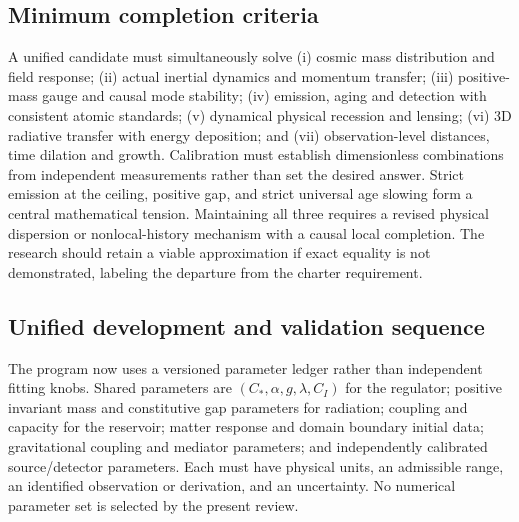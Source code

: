 \documentclass[
  11pt,
  twoside]{article}
\begin{document}
\subsection{Minimum completion
criteria}\label{minimum-completion-criteria}

A unified candidate must simultaneously solve (i) cosmic mass
distribution and field response; (ii) actual inertial dynamics and
momentum transfer; (iii) positive-mass gauge and causal mode stability;
(iv) emission, aging and detection with consistent atomic standards; (v)
dynamical physical recession and lensing; (vi) 3D radiative transfer
with energy deposition; and (vii) observation-level distances, time
dilation and growth. Calibration must establish dimensionless
combinations from independent measurements rather than set the desired
answer. Strict emission at the ceiling, positive gap, and strict
universal age slowing form a central mathematical tension. Maintaining
all three requires a revised physical dispersion or nonlocal-history
mechanism with a causal local completion. The research should retain a
viable approximation if exact equality is not demonstrated, labeling the
departure from the charter requirement.

\subsection{Unified development and validation
sequence}\label{unified-development-and-validation-sequence}

The program now uses a versioned parameter ledger rather than
independent fitting knobs. Shared parameters are
\((C_*,\alpha,g,\lambda,C_I)\) for the regulator; positive invariant
mass and constitutive gap parameters for radiation; coupling and
capacity for the reservoir; matter response and domain boundary initial
data; gravitational coupling and mediator parameters; and independently
calibrated source/detector parameters. Each must have physical units, an
admissible range, an identified observation or derivation, and an
uncertainty. No numerical parameter set is selected by the present
review.
\end{document}
